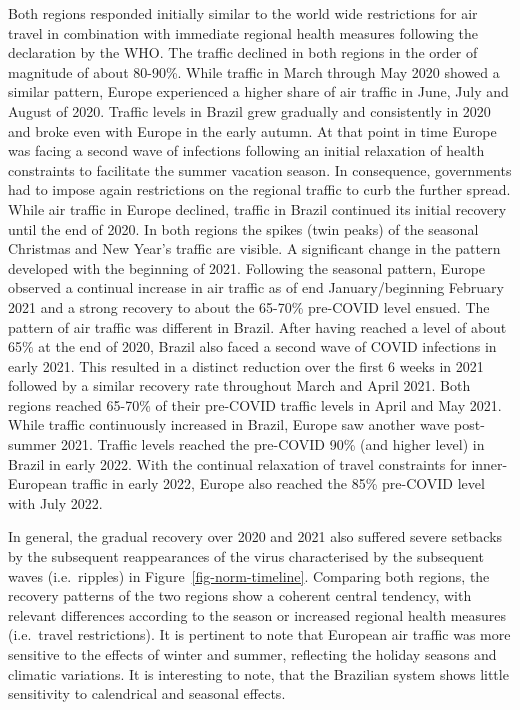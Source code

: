 \documentclass[
  a4paper,
  DIV=11,
  numbers=noendperiod]{scrreprt}
\begin{document}
Both regions responded initially similar to the world wide restrictions
for air travel in combination with immediate regional health measures
following the declaration by the WHO. The traffic declined in both
regions in the order of magnitude of about 80-90\%. While traffic in
March through May 2020 showed a similar pattern, Europe experienced a
higher share of air traffic in June, July and August of 2020. Traffic
levels in Brazil grew gradually and consistently in 2020 and broke even
with Europe in the early autumn. At that point in time Europe was facing
a second wave of infections following an initial relaxation of health
constraints to facilitate the summer vacation season. In consequence,
governments had to impose again restrictions on the regional traffic to
curb the further spread. While air traffic in Europe declined, traffic
in Brazil continued its initial recovery until the end of 2020. In both
regions the spikes (twin peaks) of the seasonal Christmas and New Year's
traffic are visible. A significant change in the pattern developed with
the beginning of 2021. Following the seasonal pattern, Europe observed a
continual increase in air traffic as of end January/beginning February
2021 and a strong recovery to about the 65-70\% pre-COVID level ensued.
The pattern of air traffic was different in Brazil. After having reached
a level of about 65\% at the end of 2020, Brazil also faced a second
wave of COVID infections in early 2021. This resulted in a distinct
reduction over the first 6 weeks in 2021 followed by a similar recovery
rate throughout March and April 2021. Both regions reached 65-70\% of
their pre-COVID traffic levels in April and May 2021. While traffic
continuously increased in Brazil, Europe saw another wave post-summer
2021. Traffic levels reached the pre-COVID 90\% (and higher level) in
Brazil in early 2022. With the continual relaxation of travel
constraints for inner-European traffic in early 2022, Europe also
reached the 85\% pre-COVID level with July 2022.

In general, the gradual recovery over 2020 and 2021 also suffered severe
setbacks by the subsequent reappearances of the virus characterised by
the subsequent waves (i.e.~ripples) in Figure~\ref{fig-norm-timeline}.
Comparing both regions, the recovery patterns of the two regions show a
coherent central tendency, with relevant differences according to the
season or increased regional health measures (i.e.~travel restrictions).
It is pertinent to note that European air traffic was more sensitive to
the effects of winter and summer, reflecting the holiday seasons and
climatic variations. It is interesting to note, that the Brazilian
system shows little sensitivity to calendrical and seasonal effects.
\end{document}
